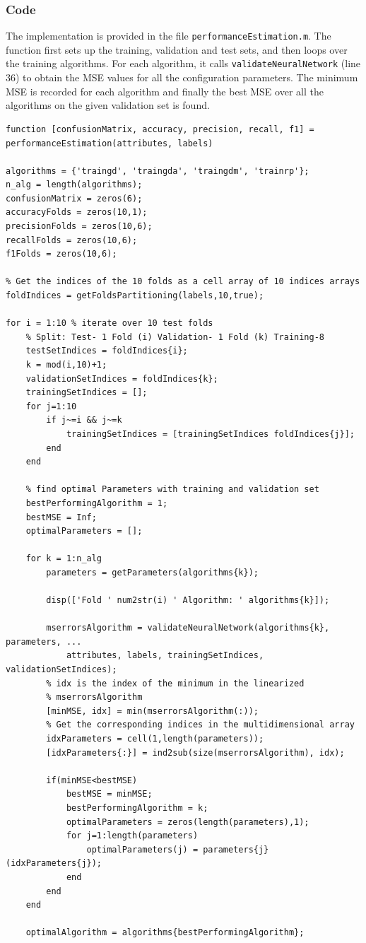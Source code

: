 \documentclass{article}
\begin{document}
\subsubsection*{Code}
The implementation is provided in the file \verb$performanceEstimation.m$. The function first sets up the training, validation and test sets, and then loops over the training algorithms. For each algorithm, it calls \verb$validateNeuralNetwork$ (line 36) to obtain the MSE values for all the configuration parameters. The minimum MSE is recorded for each algorithm and finally the best MSE over all the algorithms on the given validation set is found.\\
\begin{lstlisting}[breaklines=true]
function [confusionMatrix, accuracy, precision, recall, f1] = performanceEstimation(attributes, labels)

algorithms = {'traingd', 'traingda', 'traingdm', 'trainrp'};
n_alg = length(algorithms);
confusionMatrix = zeros(6);
accuracyFolds = zeros(10,1);
precisionFolds = zeros(10,6);
recallFolds = zeros(10,6);
f1Folds = zeros(10,6);

% Get the indices of the 10 folds as a cell array of 10 indices arrays
foldIndices = getFoldsPartitioning(labels,10,true);

for i = 1:10 % iterate over 10 test folds
    % Split: Test- 1 Fold (i) Validation- 1 Fold (k) Training-8
    testSetIndices = foldIndices{i};
    k = mod(i,10)+1;
    validationSetIndices = foldIndices{k};
    trainingSetIndices = [];
    for j=1:10
        if j~=i && j~=k
            trainingSetIndices = [trainingSetIndices foldIndices{j}];
        end
    end
    
    % find optimal Parameters with training and validation set
    bestPerformingAlgorithm = 1;
    bestMSE = Inf;
    optimalParameters = [];
    
    for k = 1:n_alg
        parameters = getParameters(algorithms{k});
        
        disp(['Fold ' num2str(i) ' Algorithm: ' algorithms{k}]);
        
        mserrorsAlgorithm = validateNeuralNetwork(algorithms{k}, parameters, ...
            attributes, labels, trainingSetIndices, validationSetIndices);
        % idx is the index of the minimum in the linearized
        % mserrorsAlgorithm
        [minMSE, idx] = min(mserrorsAlgorithm(:));
        % Get the corresponding indices in the multidimensional array
        idxParameters = cell(1,length(parameters));
        [idxParameters{:}] = ind2sub(size(mserrorsAlgorithm), idx);
        
        if(minMSE<bestMSE)
            bestMSE = minMSE;
            bestPerformingAlgorithm = k;
            optimalParameters = zeros(length(parameters),1);
            for j=1:length(parameters)
                optimalParameters(j) = parameters{j}(idxParameters{j});
            end
        end
    end
    
    optimalAlgorithm = algorithms{bestPerformingAlgorithm};
\end{lstlisting}
\end{document}
